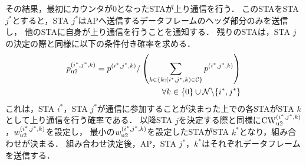 \documentclass[technicalreport]{ieicej}
\newcommand{\mthc}{\mathcal C}
\begin{document}
		その結果，最初にカウンタが0となったSTAが上り通信を行う．
		このSTAをSTA $j^*$とすると，STA $j^*$はAPへ送信するデータフレームのヘッダ部分のみを送信し，
		他のSTAに自身が上り通信を行うことを通知する．
		残りのSTAは，STA $j$の決定の際と同様に以下の条件付き確率を求める．
		\begin{align}
			p_{\rm u2}^{(i^*,j^*,k)}=p^{(i^*,j^*,k)} / \left(\sum_{k\in\{k:(i^*,j^*,k)\in\mthc\}} p^{(i^*,j^*,k)}\right)\\
			\qquad\qquad\forall k \in \{0\}\cup{\mathcal N}\backslash \{i^*,j^*\}
		\end{align}
		これは，STA $i^*$，STA $j^*$が通信に参加することが決まった上での各STAがSTA $k$として上り通信を行う確率である．
		以降STA $j$を決定する際と同様に${\rm CW}^{(i^*,j^*,k)}_{\rm u2}$，$w_{\rm u2}^{(i^*,j^*,k)}$を設定し，
		最小の$w_{\rm u2}^{(i^*,j^*,k)}$を設定したSTAがSTA $k^*$となり，組み合わせが決まる．
		組み合わせ決定後，AP，STA $j^*$，$k^*$はそれぞれデータフレームを送信する．
\end{document}
